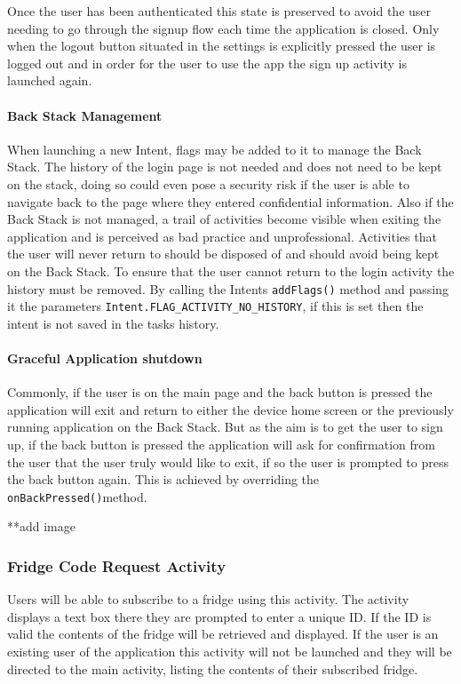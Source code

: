 \documentclass[a4paper, 11pt]{article}
\begin{document}
Once the user has been authenticated this state is preserved to avoid the user needing to go through the signup flow each time the application is closed. Only when the logout button situated in the settings is explicitly pressed the user is logged out and in order for the user to use the app the sign up activity is launched again. 


\paragraph{Back Stack Management}
When launching a new Intent, flags may be added to it to manage the Back Stack. The history of the login page is not needed and does not need to be kept on the stack, doing so could even pose a security risk if the user is able to navigate back to the page where they entered confidential information. Also if the Back Stack is not managed, a trail of activities become visible when exiting the application and is perceived as bad practice and unprofessional. Activities that the user will never return to should be disposed of and should avoid being kept on the Back Stack. To ensure that the user cannot return to the login activity the history must be removed. By calling the Intents \texttt{addFlags()} method and passing it the parameters \texttt{Intent.FLAG\_ACTIVITY\_NO\_HISTORY}, if this is set then the intent is not saved in the tasks history.


\paragraph{Graceful Application shutdown}
Commonly, if the user is on the main page and the back button is pressed the application will exit and return to either the device home screen or the previously running application on the Back Stack. But as the aim is to get the user to sign up, if the back button is pressed the application will ask for confirmation from the user that the user truly would like to exit, if so the user is prompted to press the back button again. This is achieved by overriding the \texttt{onBackPressed()}method. 

**add image


\subsubsection{Fridge Code Request Activity}
Users will be able to subscribe to a fridge using this activity. The activity displays a text box there they are prompted to enter a unique ID. If the ID is valid the contents of the fridge will be retrieved and displayed. If the user is an existing user of the application this activity will not be launched and they will be directed to the main activity, listing the contents of their subscribed fridge.
\end{document}
